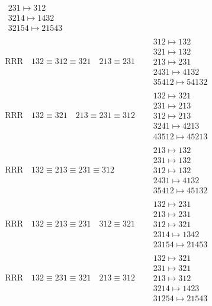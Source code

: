 \documentclass{article}
\begin{document}
\begin{align}
\begin{matrix}
\\
231 \mapsto 312
\\
3214 \mapsto 1432
\\
32154 \mapsto 21543
\end{matrix}
\\
\text{RRR}
\quad
132\equiv312\equiv321
\quad
213\equiv231
\quad
&
\begin{matrix}
312 \mapsto 132
\\
321 \mapsto 132
\\
213 \mapsto 231
\\
2431 \mapsto 4132
\\
35412 \mapsto 54132
\end{matrix}
\\
\text{RRR}
\quad
132\equiv321
\quad
213\equiv231\equiv312
\quad
&
\begin{matrix}
132 \mapsto 321
\\
231 \mapsto 213
\\
312 \mapsto 213
\\
3241 \mapsto 4213
\\
43512 \mapsto 45213
\end{matrix}
\\
\text{RRR}
\quad
132\equiv213\equiv231\equiv312
\quad
&
\begin{matrix}
213 \mapsto 132
\\
231 \mapsto 132
\\
312 \mapsto 132
\\
2431 \mapsto 4132
\\
35412 \mapsto 45132
\end{matrix}
\\
\text{RRR}
\quad
132\equiv213\equiv231
\quad
312\equiv321
\quad
&
\begin{matrix}
132 \mapsto 231
\\
213 \mapsto 231
\\
312 \mapsto 321
\\
2314 \mapsto 1342
\\
23154 \mapsto 21453
\end{matrix}
\\
\text{RRR}
\quad
132\equiv231\equiv321
\quad
213\equiv312
\quad
&
\begin{matrix}
132 \mapsto 321
\\
231 \mapsto 321
\\
213 \mapsto 312
\\
3214 \mapsto 1423
\\
31254 \mapsto 21543
\end{matrix}

\end{align}
\end{document}
